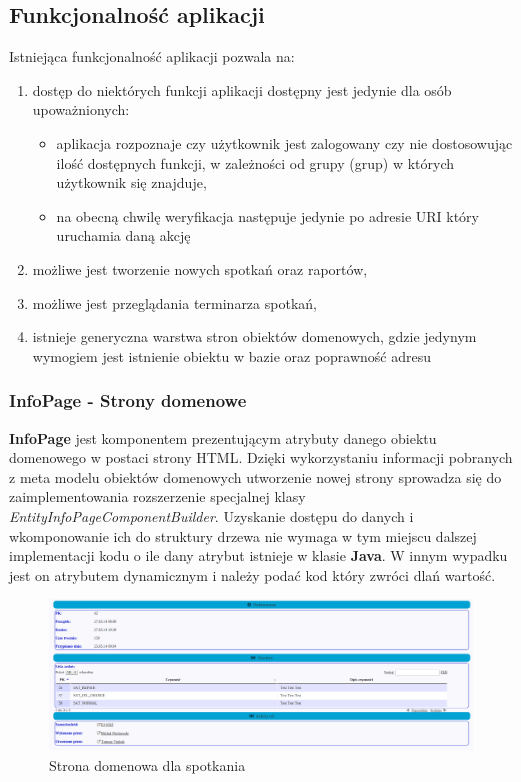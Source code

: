	\subsection{Funkcjonalność aplikacji}
	Istniejąca funkcjonalność aplikacji pozwala na:
	\begin{enumerate}
		\item dostęp do niektórych funkcji aplikacji dostępny jest jedynie dla osób upoważnionych:
		\begin{itemize}
			\item aplikacja rozpoznaje czy użytkownik jest zalogowany czy nie dostosowując ilość dostępnych funkcji,
			w zależności od grupy (grup) w których użytkownik się znajduje,
			\item na obecną chwilę weryfikacja następuje jedynie po adresie URI który uruchamia daną akcję
		\end{itemize}
		\item możliwe jest tworzenie nowych spotkań oraz raportów,
		\item możliwe jest przeglądania terminarza spotkań,
		\item istnieje generyczna warstwa stron obiektów domenowych, gdzie jedynym wymogiem jest istnienie obiektu w bazie
		oraz poprawność adresu
	\end{enumerate}

	\subsubsection{InfoPage - Strony domenowe}
		\textbf{InfoPage} jest komponentem prezentującym atrybuty danego obiektu domenowego w postaci strony HTML. 
		Dzięki wykorzystaniu informacji pobranych z meta modelu obiektów domenowych utworzenie nowej strony
		sprowadza się do zaimplementowania rozszerzenie specjalnej klasy \emph{EntityInfoPageComponentBuilder}.
		Uzyskanie dostępu do danych i wkomponowanie ich do struktury drzewa nie wymaga w tym miejscu dalszej implementacji
		kodu o ile dany atrybut istnieje w klasie \textbf{Java}. W innym wypadku jest on atrybutem dynamicznym
		i należy podać kod który zwróci dlań wartość. 
		\begin{figure}[H]
			\centering
			\includegraphics[width=1.0\textwidth]{images/infoPage}
			\caption[Strona domenowa dla spotkania]{
				Strona domenowa dla spotkania	
			}
			\label{app:infoPage}
		\end{figure}	
	

